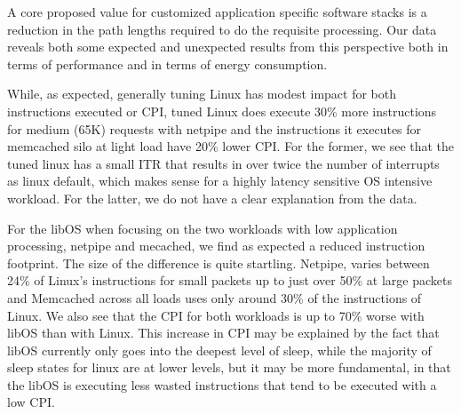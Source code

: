 
A core proposed value for customized application specific software stacks is a reduction in the path lengths required to do the requisite processing.  
Our data reveals both some expected and unexpected results from this perspective both in terms of performance and in terms of energy consumption. 

While, as expected, generally tuning Linux has modest impact for both instructions executed or CPI, tuned Linux does execute 30\% more instructions for medium (65K) requests with netpipe and  the instructions it  executes for memcached silo at light load have 20\% lower CPI.
For the former, we see that the tuned linux has a small ITR that results in over twice the number of interrupts as linux default, which makes sense for a highly latency sensitive OS intensive workload.
For the latter, we do not have a clear explanation from the data.


For the libOS when focusing on the two workloads with low application processing, netpipe and mecached,  we find as expected a reduced instruction footprint.  
The size of the difference is quite startling. 
Netpipe, varies between 24\% of Linux's instructions for small packets up to just over 50\% at large packets and Memcached across all loads uses only around 30\% of the instructions of Linux.
We also see that the CPI for both workloads is up to 70\% worse with libOS than with Linux.  
This increase in CPI may be explained by the fact that libOS currently only goes into the deepest level of sleep, while the majority of sleep states for linux are at lower levels, but it may be more fundamental, in that the libOS is executing less wasted instructions that tend to be executed with a low CPI. 

